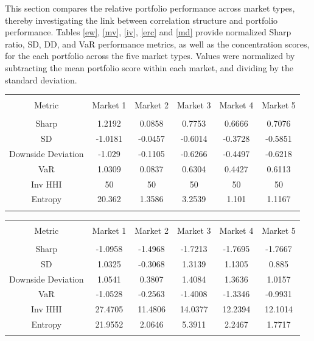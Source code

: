 \documentclass[11pt,preprint, authoryear]{elsarticle}
\let\origtable\table
\let\endorigtable\endtable
\renewenvironment{table}[1][2] {
    \expandafter\origtable\expandafter[H]
} {
    \endorigtable
}
\numberwithin{equation}{section}
\numberwithin{figure}{section}
\numberwithin{table}{section}
\begin{document}
This section compares the relative portfolio performance across market
types, thereby investigating the link between correlation structure and
portfolio performance. Tables \ref{ew}, \ref{mv}, \ref{iv}, \ref{erc}
and \ref{md} provide normalized Sharp ratio, SD, DD, and VaR performance
metrics, as well as the concentration scores, for the each portfolio
across the five market types. Values were normalized by subtracting the
mean portfolio score within each market, and dividing by the standard
deviation.

\begin{table}[!htbp] \centering 
  \caption{Equal Weight} 
  \label{ew} 
\begin{tabular}{@{\extracolsep{5pt}} cccccc} 
\\[-1.8ex]\hline 
\hline \\[-1.8ex] 
Metric & Market 1 & Market 2 & Market 3 & Market 4 & Market 5 \\ 
\hline \\[-1.8ex] 
Sharp & 1.2192 & 0.0858 & 0.7753 & 0.6666 & 0.7076 \\ 
SD & -1.0181 & -0.0457 & -0.6014 & -0.3728 & -0.5851 \\ 
Downside Deviation & -1.029 & -0.1105 & -0.6266 & -0.4497 & -0.6218 \\ 
VaR & 1.0309 & 0.0837 & 0.6304 & 0.4427 & 0.6113 \\ 
Inv HHI & 50 & 50 & 50 & 50 & 50 \\ 
Entropy & 20.362 & 1.3586 & 3.2539 & 1.101 & 1.1167 \\ 
\hline \\[-1.8ex] 
\end{tabular} 
\end{table}

\begin{table}[!htbp] \centering 
  \caption{Minimum Variance} 
  \label{mv} 
\begin{tabular}{@{\extracolsep{5pt}} cccccc} 
\\[-1.8ex]\hline 
\hline \\[-1.8ex] 
Metric & Market 1 & Market 2 & Market 3 & Market 4 & Market 5 \\ 
\hline \\[-1.8ex] 
Sharp & -1.0958 & -1.4968 & -1.7213 & -1.7695 & -1.7667 \\ 
SD & 1.0325 & -0.3068 & 1.3139 & 1.1305 & 0.885 \\ 
Downside Deviation & 1.0541 & 0.3807 & 1.4084 & 1.3636 & 1.0157 \\ 
VaR & -1.0528 & -0.2563 & -1.4008 & -1.3346 & -0.9931 \\ 
Inv HHI & 27.4705 & 11.4806 & 14.0377 & 12.2394 & 12.1014 \\ 
Entropy & 21.9552 & 2.0646 & 5.3911 & 2.2467 & 1.7717 \\ 
\hline \\[-1.8ex] 
\end{tabular} 
\end{table}
\end{document}
